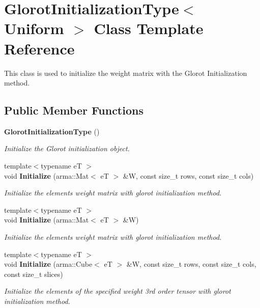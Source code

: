 \section{Glorot\+Initialization\+Type$<$ Uniform $>$ Class Template Reference}
\label{classmlpack_1_1ann_1_1GlorotInitializationType}


This class is used to initialize the weight matrix with the Glorot Initialization method.  


\subsection*{Public Member Functions}
\begin{DoxyCompactItemize}
\item 
\textbf{ Glorot\+Initialization\+Type} ()
\begin{DoxyCompactList}\small\item\em Initialize the Glorot initialization object. \end{DoxyCompactList}\item 
{\footnotesize template$<$typename eT $>$ }\\void \textbf{ Initialize} (arma\+::\+Mat$<$ eT $>$ \&W, const size\+\_\+t rows, const size\+\_\+t cols)
\begin{DoxyCompactList}\small\item\em Initialize the elements weight matrix with glorot initialization method. \end{DoxyCompactList}\item 
{\footnotesize template$<$typename eT $>$ }\\void \textbf{ Initialize} (arma\+::\+Mat$<$ eT $>$ \&W)
\begin{DoxyCompactList}\small\item\em Initialize the elements weight matrix with glorot initialization method. \end{DoxyCompactList}\item 
{\footnotesize template$<$typename eT $>$ }\\void \textbf{ Initialize} (arma\+::\+Cube$<$ eT $>$ \&W, const size\+\_\+t rows, const size\+\_\+t cols, const size\+\_\+t slices)
\begin{DoxyCompactList}\small\item\em Initialize the elements of the specified weight 3rd order tensor with glorot initialization method. \end{DoxyCompactList}\item 

\end{DoxyCompactItemize}
